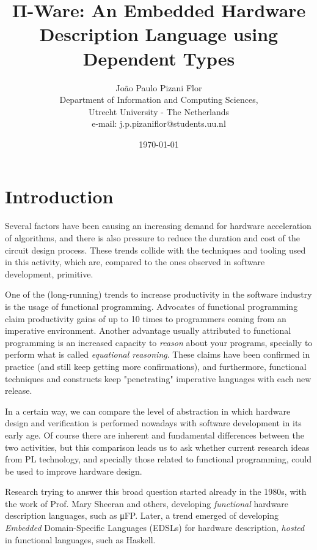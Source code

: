 \documentclass[a4paper]{article}
\title{Π-Ware: An Embedded Hardware Description Language using Dependent Types}
\date{\today}
\author{
    João Paulo Pizani Flor \\
    Department of Information and Computing Sciences, \\
    Utrecht University - The Netherlands \\
    e-mail: j.p.pizaniflor@students.uu.nl
}
\begin{document}
    \maketitle


    \section{Introduction}
    \label{sec:intro}

        Several factors have been causing an increasing demand for hardware acceleration of algorithms,
        and there is also pressure to reduce the duration and cost of the circuit design process.
        These trends collide with the techniques and tooling used in this activity, which are,
        compared to the ones observed in software development, primitive.


        One of the (long-running) trends to increase productivity in the software industry
        is the usage of functional programming.
        Advocates of functional programming claim productivity gains of up to 10 times to
        programmers coming from an imperative environment.
        Another advantage usually attributed to functional programming is an increased capacity to
        \emph{reason} about your programs, specially to perform what is called \emph{equational reasoning}.
        These claims have been confirmed in practice (and still keep getting more confirmations),
        and furthermore, functional techniques and constructs keep "penetrating" imperative languages
        with each new release. %


        In a certain way, we can compare the level of abstraction in which hardware design and verification
        is performed nowadays with software development in its early age.
        Of course there are inherent and fundamental differences between the two activities, but
        this comparison leads us to ask whether current research ideas from PL technology,
        and specially those related to functional programming, could be used to improve hardware design.

        Research trying to answer this broad question started already in the 1980s,
        with the work of Prof. Mary Sheeran and others,
        developing \emph{functional} hardware description languages, such as μFP.
        Later, a trend emerged of developing \emph{Embedded} Domain-Specific Languages (EDSLs)
        for hardware description, \emph{hosted} in functional languages, such as Haskell.
\end{document}
